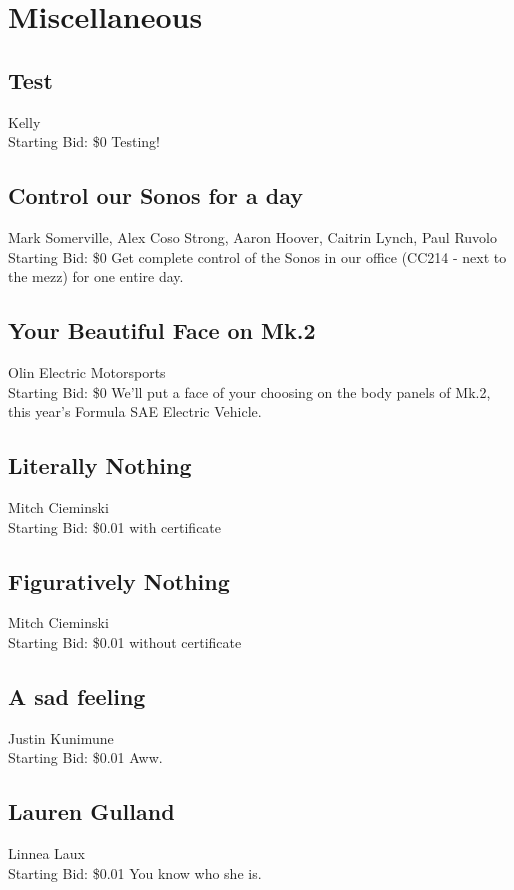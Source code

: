 \documentclass[11pt]{article}
\begin{document}
\section{Miscellaneous}
\subsection{Test}
Kelly
\\
Starting Bid: \$0
\newline
Testing!
\subsection{Control our Sonos for a day}
Mark Somerville, Alex Coso Strong, Aaron Hoover, Caitrin Lynch, Paul Ruvolo
\\
Starting Bid: \$0
\newline
Get complete control of the Sonos in our office (CC214 - next to the mezz) for one entire day.
\subsection{Your Beautiful Face on Mk.2}
Olin Electric Motorsports
\\
Starting Bid: \$0
\newline
We'll put a face of your choosing on the body panels of Mk.2, this year's Formula SAE Electric Vehicle.
\subsection{Literally Nothing}
Mitch Cieminski
\\
Starting Bid: \$0.01
\newline
with certificate
\subsection{Figuratively Nothing}
Mitch Cieminski
\\
Starting Bid: \$0.01
\newline
without certificate
\subsection{A sad feeling}
Justin Kunimune
\\
Starting Bid: \$0.01
\newline
Aww.
\subsection{Lauren Gulland}
Linnea Laux
\\
Starting Bid: \$0.01
\newline
You know who she is.
\end{document}
